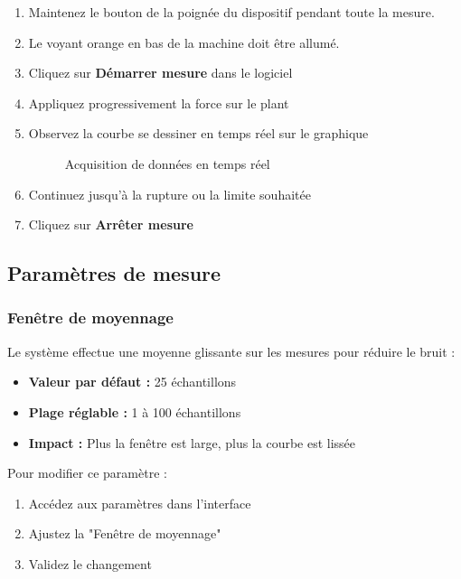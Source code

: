 \documentclass[12pt,a4paper]{article}
\begin{document}
\begin{enumerate}
    \item Maintenez le bouton de la poignée du dispositif pendant toute la mesure.
    \item Le voyant orange en bas de la machine doit être allumé.
    \item Cliquez sur \textbf{Démarrer mesure} dans le logiciel
    \item Appliquez progressivement la force sur le plant
    \item Observez la courbe se dessiner en temps réel sur le graphique
    \begin{figure}[H]
        \centering
        \caption{Acquisition de données en temps réel}
        \label{fig:mesure_cours}
    \end{figure}
    
    \item Continuez jusqu'à la rupture ou la limite souhaitée
    \item Cliquez sur \textbf{Arrêter mesure}
\end{enumerate}

\subsection{Paramètres de mesure}

\subsubsection{Fenêtre de moyennage}

Le système effectue une moyenne glissante sur les mesures pour réduire le bruit :
\begin{itemize}
    \item \textbf{Valeur par défaut :} 25 échantillons
    \item \textbf{Plage réglable :} 1 à 100 échantillons
    \item \textbf{Impact :} Plus la fenêtre est large, plus la courbe est lissée
\end{itemize}

Pour modifier ce paramètre :
\begin{enumerate}
    \item Accédez aux paramètres dans l'interface
    \item Ajustez la "Fenêtre de moyennage"
    \item Validez le changement
\end{enumerate}
\end{document}
